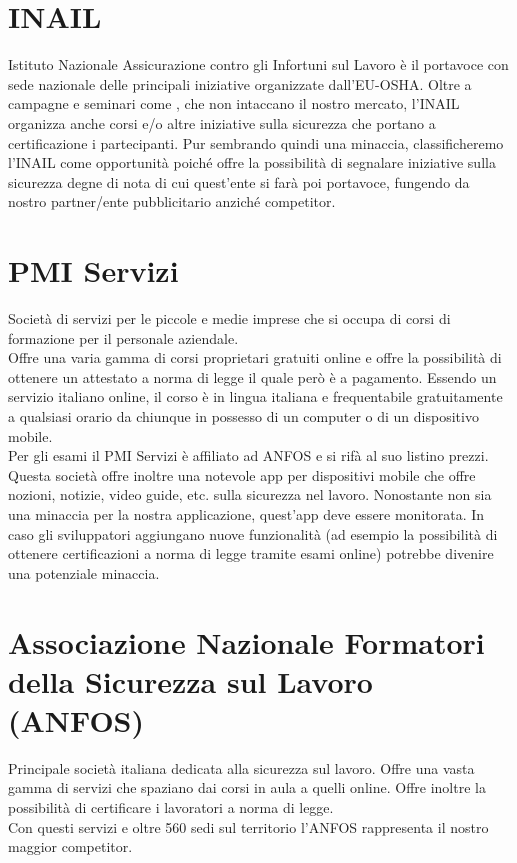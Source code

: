 \section*{INAIL}

Istituto Nazionale Assicurazione contro gli Infortuni sul Lavoro è il portavoce con sede nazionale delle principali iniziative organizzate dall'EU-OSHA. Oltre a campagne e seminari come , che non intaccano il nostro mercato, l'INAIL organizza anche corsi e/o altre iniziative sulla sicurezza che portano a certificazione i partecipanti. Pur sembrando quindi una minaccia, classificheremo l'INAIL come opportunità poiché offre la possibilità di segnalare iniziative sulla sicurezza degne di nota di cui quest'ente si farà poi portavoce, fungendo da nostro partner/ente pubblicitario anziché competitor.

\section*{PMI Servizi}

Società di servizi per le piccole e medie imprese che si occupa di corsi di formazione per il personale aziendale.\\
Offre una varia gamma di corsi proprietari gratuiti online e offre la possibilità di ottenere un attestato a norma di legge il quale però è a pagamento. Essendo un servizio italiano online, il corso è in lingua italiana e frequentabile gratuitamente a qualsiasi orario da chiunque in possesso di un computer o di un dispositivo mobile.\\
Per gli esami il PMI Servizi è affiliato ad ANFOS e si rifà al suo listino prezzi.\\
Questa società offre inoltre  una notevole app per dispositivi mobile che offre nozioni, notizie, video guide, etc. sulla sicurezza nel lavoro. Nonostante non sia una minaccia per la nostra applicazione, quest'app deve essere monitorata. In caso gli sviluppatori aggiungano nuove funzionalità (ad esempio la possibilità di ottenere certificazioni a norma di legge tramite esami online) potrebbe divenire una potenziale minaccia.

\section*{Associazione Nazionale Formatori della Sicurezza sul Lavoro (ANFOS)}

Principale società italiana dedicata alla sicurezza sul lavoro. Offre una vasta gamma di servizi che spaziano dai corsi in aula a quelli online. Offre inoltre la possibilità di certificare i lavoratori a norma di legge.\\
Con questi servizi e oltre 560 sedi sul territorio l'ANFOS rappresenta il nostro maggior competitor.\\

